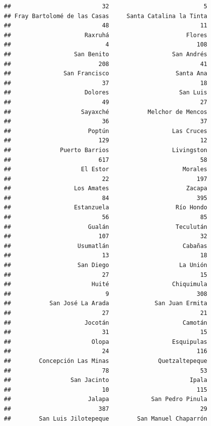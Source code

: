 \documentclass[
]{article}
\begin{document}
\begin{verbatim}
##                          32                           5 
## Fray Bartolomé de las Casas     Santa Catalina la Tinta 
##                          48                          11 
##                     Raxruhá                      Flores 
##                           4                         108 
##                  San Benito                  San Andrés 
##                         208                          41 
##               San Francisco                   Santa Ana 
##                          37                          18 
##                     Dolores                    San Luis 
##                          49                          27 
##                    Sayaxché           Melchor de Mencos 
##                          36                          37 
##                      Poptún                  Las Cruces 
##                         129                          12 
##              Puerto Barrios                  Livingston 
##                         617                          58 
##                    El Estor                     Morales 
##                          22                         197 
##                  Los Amates                      Zacapa 
##                          84                         395 
##                  Estanzuela                   Río Hondo 
##                          56                          85 
##                      Gualán                   Teculután 
##                         107                          32 
##                   Usumatlán                     Cabañas 
##                          13                          18 
##                   San Diego                    La Unión 
##                          27                          15 
##                       Huité                  Chiquimula 
##                           9                         308 
##           San José La Arada             San Juan Ermita 
##                          27                          21 
##                     Jocotán                     Camotán 
##                          31                          15 
##                       Olopa                  Esquipulas 
##                          24                         116 
##        Concepción Las Minas              Quetzaltepeque 
##                          78                          53 
##                 San Jacinto                       Ipala 
##                          10                         115 
##                      Jalapa            San Pedro Pinula 
##                         387                          29 
##        San Luis Jilotepeque        San Manuel Chaparrón 

\end{verbatim}
\end{document}
